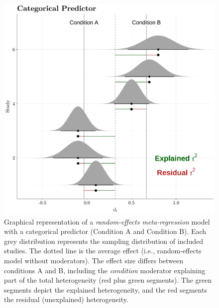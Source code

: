 \documentclass[
  man,floatsintext]{apa6}
\begin{document}
\begin{figure}[H]

{\centering \includegraphics[width=0.8\linewidth]{paper_files/figure-latex/img-metaregression-bin-1} 

}

\caption{Graphical representation of a \emph{random-effects meta-regression} model with a categorical predictor (Condition A and Condition B). Each grey distribution represents the sampling distribution of included studies. The dotted line is the average effect (i.e., random-effects model without moderators). The effect size differs between conditions A and B, including the \emph{condition} moderator explaining part of the total heterogeneity (red plus green segments). The green segments depict the explained heterogeneity, and the red segments the residual (unexplained) heterogeneity.}\label{fig:img-metaregression-bin}
\end{figure}

\normalsize

\scriptsize
\end{document}
